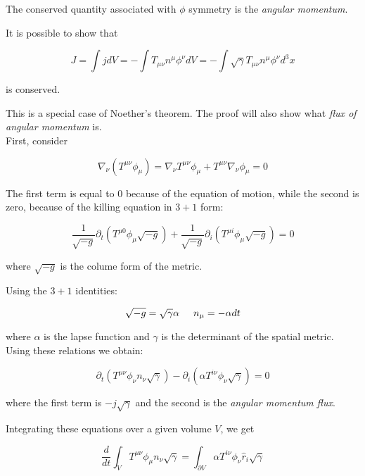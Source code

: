 The conserved quantity associated with $\phi$ symmetry is the \textit{angular momentum}. 

It is possible to show that

\begin{equation}
J = \int j dV = - \int T_{\mu\nu}n^{\mu}\phi^{\nu} dV = -\int \sqrt{\gamma}T_{\mu\nu}n^{\mu}\phi^{\nu} d^3 x
\end{equation}

is conserved. 

This is a special case of Noether's theorem. The proof will also show what \textit{flux of angular momentum} is. \\
First, consider

\begin{equation}
\nabla_{\nu} (T^{\mu\nu}\phi_{\mu}) = \nabla_{\nu}T^{\mu\nu}\phi_{\mu} + T^{\mu\nu}\nabla_{\nu}\phi_{\mu} = 0
\end{equation}

The first term is equal to 0 because of the equation of motion, while the second is zero, because of the killing equation in $3+1$ form:

\begin{equation}
\frac{1}{\sqrt{-g}}\partial_t(T^{\mu 0}\phi_{\mu}\sqrt{-g}) + \frac{1}{\sqrt{-g}}\partial_{i}(T^{\mu i}\phi_{\mu}\sqrt{-g}) = 0
\end{equation}

where $\sqrt{-g}$ is the colume form of the metric. 

Using the $3+1$ identities:

\begin{equation}
\sqrt{-g} = \sqrt{\gamma}\alpha \hspace{5mm} n_{\mu} = -\alpha dt
\end{equation}

where $\alpha$ is the lapse function and $\gamma$ is the determinant of the spatial metric. Using these relations we obtain:

\begin{equation}
\partial_t(T^{\mu\nu}\phi_{\nu}n_{\nu}\sqrt{\gamma}) - \partial_i(\alpha T^{i \nu}\phi_{\nu}\sqrt{\gamma}) = 0
\end{equation}

where the first term is $-j\sqrt{\gamma}$ and the second is the 
\textit{angular momentum flux}. 

Integrating these equations over a given volume $V$, we get 

\begin{equation}
\frac{d}{dt} \int_V T^{\mu\nu}\phi_{\mu}n_{\nu}\sqrt{\gamma} = \int_{\partial V}\alpha T^{i \nu}\phi_{\nu} \hat{r}_i\sqrt{\gamma}
\end{equation}

